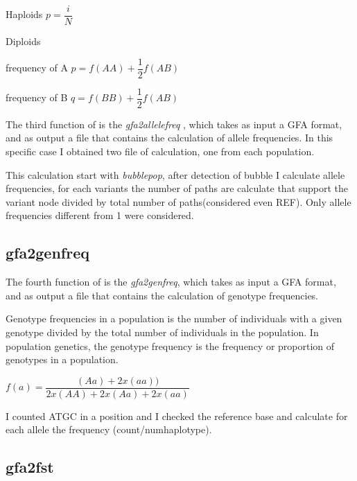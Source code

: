 Haploids    $p = \dfrac{i}{N}$

Diploids   

frequency of A $p = {f(AA)} + \dfrac{1}{2} f(AB)$

frequency of B $q = {f(BB)} + \dfrac{1}{2} f(AB)$

The third function of \vgp is the \textit{gfa2allelefreq} , which takes as input a GFA format, and as output a file that contains the calculation of allele frequencies.
In this specific case I obtained two file of calculation, one from each population. 

This calculation start with \textit{bubblepop}, after detection of bubble I calculate allele frequencies, for each variants the number of  paths  are  calculate  that  support  the  variant node divided  by  total  number  of  paths(considered even REF).
Only allele frequencies different from 1 were considered. 
 



\subsection{gfa2genfreq}

The fourth function of \vgp is the \textit{gfa2genfreq}, which takes as input a GFA format, and as output a file that contains the calculation of genotype frequencies.

Genotype frequencies \cite{brooker2014principles} in a population is the number of individuals with a given genotype divided by the total number of individuals in the population. In population genetics, the genotype frequency is the frequency or proportion of genotypes in a population. 

$f(a) = \dfrac{(Aa) + 2 x (aa))}{2 x (AA) + 2 x (Aa) + 2 x (aa)}$

I counted ATGC in a position and I checked the reference base and calculate for each allele the frequency (count/numhaplotype).




\subsection{gfa2fst}


